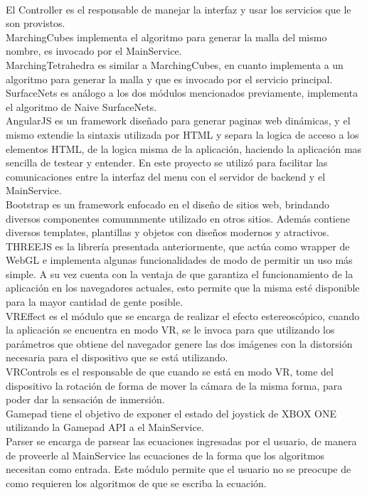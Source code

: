 \documentclass[12pt]{article}
\begin{document}
\\El Controller es el responsable de manejar la interfaz y usar los servicios que le son provistos.
\\MarchingCubes implementa el algoritmo para generar la malla del mismo nombre, es invocado por el MainService.
\\MarchingTetrahedra es similar a MarchingCubes, en cuanto implementa a un algoritmo para generar la malla y que es invocado por el servicio principal.
\\SurfaceNets es análogo a los dos módulos mencionados previamente, implementa el algoritmo de Naive SurfaceNets.
\\AngularJS es un framework diseñado para generar paginas web dinámicas, y el mismo extendie la sintaxis utilizada por HTML y separa la logica de acceso a los elementos HTML, de la logica misma de la aplicación, haciendo la aplicación mas sencilla de testear y entender. En este proyecto se utilizó para facilitar las comunicaciones entre la interfaz del menu con el servidor de backend y el MainService.
\\Bootstrap es un framework enfocado en el diseño de sitios web, brindando diversos componentes comumnmente utilizado en otros sitios. Además contiene diversos templates, plantillas y objetos con diseños modernos y atractivos. 
\\THREEJS es la librería presentada anteriormente, que actúa como wrapper de WebGL e implementa algunas funcionalidades de modo de permitir un uso más simple. A su vez cuenta con la ventaja de que garantiza el funcionamiento de la aplicación en los navegadores actuales, esto permite que la misma esté disponible para la mayor cantidad de gente posible.
\\VREffect es el módulo que se encarga de realizar el efecto estereoscópico, cuando la aplicación se encuentra en modo VR, se le invoca para que utilizando los parámetros que obtiene del navegador genere las dos imágenes con la distorsión necesaria para el dispositivo que se está utilizando.
\\VRControls es el responsable de que cuando se está en modo VR, tome del dispositivo la rotación de forma de mover la cámara de la misma forma, para poder dar la sensación de inmersión.
\\Gamepad tiene el objetivo de exponer el estado del joystick de XBOX ONE utilizando la Gamepad API\cite{gamepadapi} a el MainService.
\\Parser se encarga de parsear las ecuaciones ingresadas por el usuario, de manera de proveerle al MainService las ecuaciones de la forma que los algoritmos necesitan como entrada. Este módulo permite que el usuario no se preocupe de como requieren los algoritmos de que se escriba la ecuación.
\end{document}
